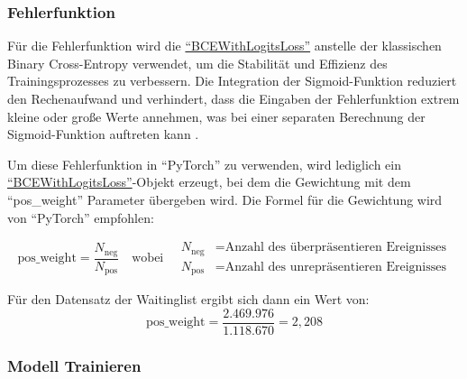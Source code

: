 \subsubsection{Fehlerfunktion}
Für die Fehlerfunktion wird die \href{https://pytorch.org/docs/stable/generated/torch.nn.BCEWithLogitsLoss.html}{\enquote{BCEWithLogitsLoss}} anstelle der klassischen Binary Cross-Entropy verwendet, um die Stabilität und Effizienz des Trainingsprozesses zu verbessern. 
Die Integration der Sigmoid-Funktion reduziert den Rechenaufwand und verhindert, dass die Eingaben der Fehlerfunktion extrem kleine oder große Werte annehmen, was bei einer separaten Berechnung der Sigmoid-Funktion auftreten kann \cite{Goodfellow2016}.

Um diese Fehlerfunktion in \enquote{PyTorch} zu verwenden, wird lediglich ein \href{https://pytorch.org/docs/stable/generated/torch.nn.BCEWithLogitsLoss.html}{\enquote{BCEWithLogitsLoss}}-Objekt erzeugt, bei dem die Gewichtung mit dem \enquote{pos\_weight} Parameter übergeben wird. Die Formel für die Gewichtung wird von \enquote{PyTorch} empfohlen:

\[
\text{pos\_weight} = \frac{N_{\text{neg}}}{N_{\text{pos}}}
\quad \text{wobei} \quad
\begin{alignedat}{2}
    N_{\text{neg}} &= \text{Anzahl des überpräsentieren Ereignisses} \\
    N_{\text{pos}} &= \text{Anzahl des unrepräsentieren Ereignisses}
\end{alignedat}
\]

Für den Datensatz der Waitinglist ergibt sich dann ein Wert von: 
\[
\text{pos\_weight} = \frac{2.469.976}{1.118.670} = 2,208
\]

\subsubsection{Modell Trainieren}
\label{sec:model_training_nn}

